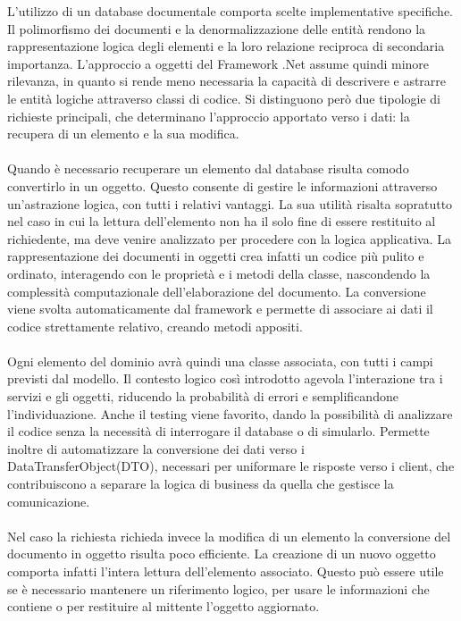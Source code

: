 L'utilizzo di un database documentale comporta
scelte implementative specifiche.
Il polimorfismo dei documenti e la denormalizzazione delle entità
rendono la rappresentazione logica degli elementi
e la loro relazione reciproca di secondaria importanza.
L'approccio a oggetti del Framework .Net assume quindi minore rilevanza,
in quanto si rende meno necessaria la capacità di descrivere e astrarre
le entità logiche attraverso classi di codice.
Si distinguono però due tipologie di richieste principali,
che determinano l'approccio apportato verso i dati:
la recupera di un elemento e la sua modifica.\\
\\
Quando è necessario recuperare un elemento dal database
risulta comodo convertirlo in un oggetto.
Questo consente di gestire le informazioni attraverso un'astrazione logica,
con tutti i relativi vantaggi.
La sua utilità risalta sopratutto nel caso in cui la lettura dell'elemento
non ha il solo fine di essere restituito al richiedente,
ma deve venire analizzato per procedere con la logica applicativa.
La rappresentazione dei documenti in oggetti 
crea infatti un codice più pulito e ordinato,
interagendo con le proprietà e i metodi della classe,
nascondendo la complessità computazionale dell'elaborazione del documento.
La conversione viene svolta automaticamente dal framework
e permette di associare ai dati il codice strettamente relativo, creando metodi appositi.\\
\\
Ogni elemento del dominio avrà quindi una classe associata,
con tutti i campi previsti dal modello.
Il contesto logico così introdotto agevola l'interazione tra i servizi e gli oggetti,
riducendo la probabilità di errori e semplificandone l'individuazione.
Anche il testing viene favorito, dando la possibilità di analizzare il codice
senza la necessità di interrogare il database o di simularlo.
Permette inoltre di automatizzare la conversione dei dati verso i DataTransferObject(DTO),
necessari per uniformare le risposte verso i client,
che contribuiscono a separare la logica di business da quella che gestisce la comunicazione.\\
\\
Nel caso la richiesta richieda invece la modifica di un elemento
la conversione del documento in oggetto risulta poco efficiente.
La creazione di un nuovo oggetto comporta infatti l'intera lettura dell'elemento associato.
Questo può essere utile se è necessario mantenere un riferimento logico,
per usare le informazioni che contiene
o per restituire al mittente l'oggetto aggiornato.
